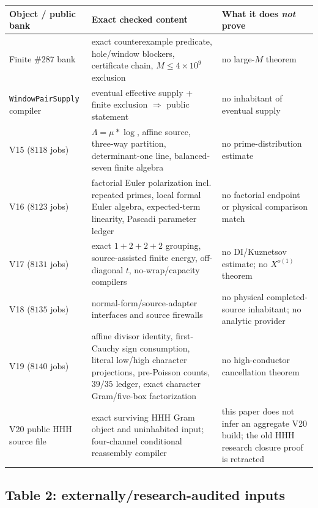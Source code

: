 \documentclass[11pt]{article}
\theoremstyle{definition}
\newcommand{\1}{\mathbf 1}
\begin{document}
\begin{center}
\scriptsize
\renewcommand{\arraystretch}{1.12}
\begin{tabularx}{\textwidth}{p{}p{}X}
\toprule
Object / public bank & Exact checked content & What it does \emph{not} prove\\
\midrule
Finite \#287 bank & exact counterexample predicate, hole/window blockers, certificate chain, $M\le4\times10^9$ exclusion & no large-$M$ theorem\\
\texttt{WindowPairSupply} compiler & eventual effective supply + finite exclusion $\Rightarrow$ public statement & no inhabitant of eventual supply\\
V15 ($8118$ jobs) & $\Lambda=\mu*\log$, affine source, three-way partition, determinant-one line, balanced-seven finite algebra & no prime-distribution estimate\\
V16 ($8123$ jobs) & factorial Euler polarization incl. repeated primes, local formal Euler algebra, expected-term linearity, Pascadi parameter ledger & no factorial endpoint or physical comparison match\\
V17 ($8131$ jobs) & exact $1+2+2+2$ grouping, source-assisted finite energy, off-diagonal $t$, no-wrap/capacity compilers & no DI/Kuznetsov estimate; no $X^{o(1)}$ theorem\\
V18 ($8135$ jobs) & normal-form/source-adapter interfaces and source firewalls & no physical completed-source inhabitant; no analytic provider\\
V19 ($8140$ jobs) & affine divisor identity, first-Cauchy sign consumption, literal low/high character projections, pre-Poisson counts, $39/35$ ledger, exact character Gram/five-box factorization & no high-conductor cancellation theorem\\
V20 public HHH source file & exact surviving HHH Gram object and uninhabited input; four-channel conditional reassembly compiler & this paper does not infer an aggregate V20 build; the old HHH research closure proof is retracted\\
\bottomrule
\end{tabularx}
\end{center}

\subsection{Table 2: externally/research-audited inputs}
\end{document}
